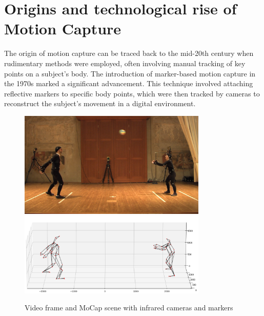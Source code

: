 \section{Origins and technological rise of Motion Capture}
The origin of motion capture can be traced back to the mid-20th century when rudimentary methods were employed, 
often involving manual tracking of key points on a subject's body. 
The introduction of marker-based motion capture in the 1970s marked a significant advancement. 
This technique involved attaching reflective markers to specific body points, 
which were then tracked by cameras to reconstruct the subject's movement in a digital environment. 
\begin{figure}[H]
    \centering
    \includegraphics[width=0.8\textwidth]{graphics/bodyMarkersExampleImage.png}
    \includegraphics[width=0.8\textwidth]{graphics/bodyMarkersExampleMoCap.png}
    \caption{Video frame and MoCap scene with infrared cameras and markers}
    \label{fig:common}
\end{figure}


